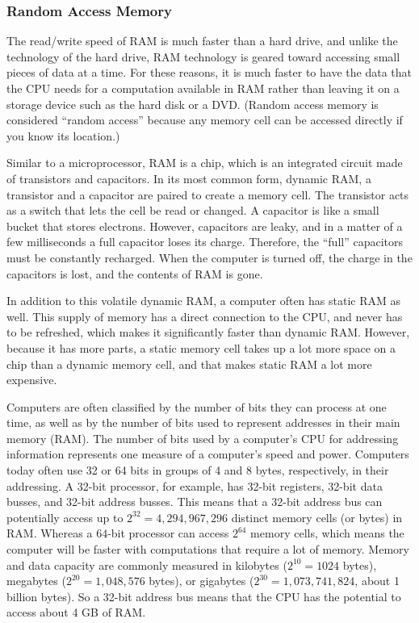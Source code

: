 \subsubsection{Random Access Memory}
The read/write speed of RAM is much faster than a hard drive, and
unlike the technology of the hard drive, RAM technology is geared
toward accessing small pieces of data at a time.  For these reasons,
it is much faster to have the data that the CPU needs for a
computation available in RAM rather than leaving it on a storage
device such as the hard disk or a DVD.  (Random access memory is
considered ``random access'' because any memory cell can be accessed
directly if you know its location.)

Similar to a microprocessor, RAM is a chip, which is an integrated
circuit made of transistors and capacitors. In its most common form,
dynamic RAM, a transistor and a capacitor are paired to create a
memory cell.  The transistor acts as a switch that lets the cell be
read or changed. A capacitor is like a small bucket that stores
electrons. However, capacitors are leaky, and in a matter of a few
milliseconds a full capacitor loses its charge.  Therefore, the
``full'' capacitors must be constantly recharged. When the computer is
turned off, the charge in the capacitors is lost, and the contents of
RAM is gone.

In addition to this volatile dynamic RAM, a computer often has static
RAM as well.  This supply of memory has a direct connection to the
CPU, and never has to be refreshed, which makes it significantly
faster than dynamic RAM.  However, because it has more parts, a static
memory cell takes up a lot more space on a chip than a dynamic memory
cell, and that makes static RAM a lot more expensive.

Computers are often classified by the number of bits they can process
at one time, as well as by the number of bits used to represent
addresses in their main memory (RAM).  The number of bits used by a
computer's CPU for addressing information represents one measure of a
computer's speed and power.  Computers today often use 32 or 64 bits
in groups of 4 and 8 bytes, respectively, in their addressing.  A
32-bit processor, for example, has 32-bit registers, 32-bit data
busses, and 32-bit address busses. This means that a 32-bit address
bus can potentially access up to $2^{32} = 4,294,967,296$ distinct
memory cells (or bytes) in RAM. Whereas a $64$-bit processor can
access $2^{64}$ memory cells, which means the computer will be faster
with computations that require a lot of memory. Memory and data
capacity are commonly measured in kilobytes ($2^{10} = 1024$ bytes),
megabytes ($2^{20} = 1,048,576$ bytes), or gigabytes ($2^{30} =
1,073,741,824$, about 1 billion bytes). So a 32-bit address bus means
that the CPU has the potential to access about 4 GB of RAM.

